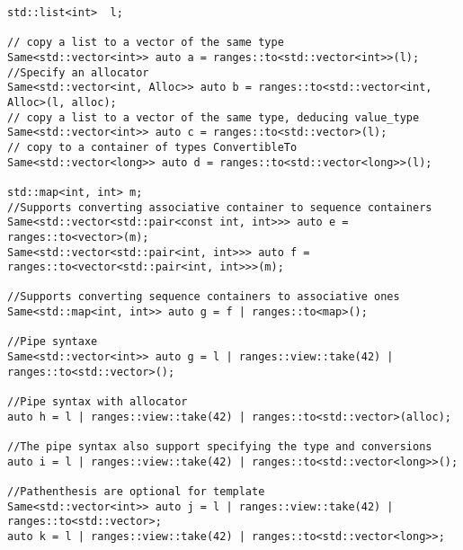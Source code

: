 \documentclass{wg21}
\begin{document}
\begin{verbatim}
std::list<int>  l;

// copy a list to a vector of the same type
Same<std::vector<int>> auto a = ranges::to<std::vector<int>>(l);
//Specify an allocator
Same<std::vector<int, Alloc>> auto b = ranges::to<std::vector<int, Alloc>(l, alloc);
// copy a list to a vector of the same type, deducing value_type
Same<std::vector<int>> auto c = ranges::to<std::vector>(l);
// copy to a container of types ConvertibleTo
Same<std::vector<long>> auto d = ranges::to<std::vector<long>>(l);

std::map<int, int> m;
//Supports converting associative container to sequence containers
Same<std::vector<std::pair<const int, int>>> auto e = ranges::to<vector>(m);
Same<std::vector<std::pair<int, int>>> auto f = ranges::to<vector<std::pair<int, int>>>(m);

//Supports converting sequence containers to associative ones
Same<std::map<int, int>> auto g = f | ranges::to<map>();

//Pipe syntaxe
Same<std::vector<int>> auto g = l | ranges::view::take(42) | ranges::to<std::vector>();

//Pipe syntax with allocator
auto h = l | ranges::view::take(42) | ranges::to<std::vector>(alloc);

//The pipe syntax also support specifying the type and conversions
auto i = l | ranges::view::take(42) | ranges::to<std::vector<long>>();

//Pathenthesis are optional for template
Same<std::vector<int>> auto j = l | ranges::view::take(42) | ranges::to<std::vector>;
auto k = l | ranges::view::take(42) | ranges::to<std::vector<long>>; 
 
\end{verbatim}

\pagebreak
\end{document}
